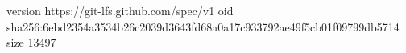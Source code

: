 version https://git-lfs.github.com/spec/v1
oid sha256:6ebd2354a3534b26c2039d3643fd68a0a17c933792ae49f5cb01f09799db5714
size 13497
